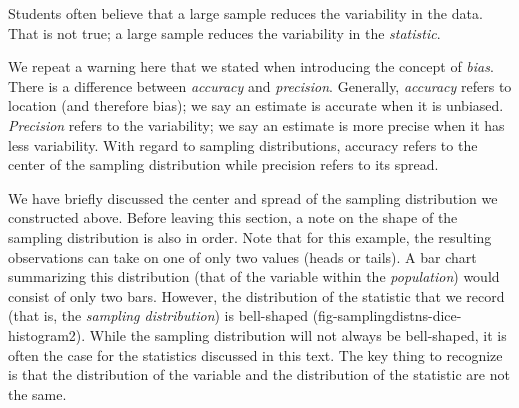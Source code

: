 \documentclass[
  letterpaper,
  DIV=11,
  numbers=noendperiod]{scrreprt}
\theoremstyle{definition}
\theoremstyle{definition}
\theoremstyle{plain}
\theoremstyle{remark}
\begin{document}
\begin{tcolorbox}[enhanced jigsaw, colbacktitle=quarto-callout-note-color!10!white, colback=white, left=2mm, title=\textcolor{quarto-callout-note-color}{\faInfo}\hspace{0.5em}{Note}, toptitle=1mm, leftrule=.75mm, breakable, bottomrule=.15mm, arc=.35mm, rightrule=.15mm, toprule=.15mm, coltitle=black, opacityback=0, colframe=quarto-callout-note-color-frame, opacitybacktitle=0.6, bottomtitle=1mm, titlerule=0mm]

Students often believe that a large sample reduces the variability in
the data. That is not true; a large sample reduces the variability in
the \emph{statistic}.

\end{tcolorbox}

\begin{tcolorbox}[enhanced jigsaw, colbacktitle=quarto-callout-warning-color!10!white, colback=white, left=2mm, title=\textcolor{quarto-callout-warning-color}{\faExclamationTriangle}\hspace{0.5em}{Warning}, toptitle=1mm, leftrule=.75mm, breakable, bottomrule=.15mm, arc=.35mm, rightrule=.15mm, toprule=.15mm, coltitle=black, opacityback=0, colframe=quarto-callout-warning-color-frame, opacitybacktitle=0.6, bottomtitle=1mm, titlerule=0mm]

We repeat a warning here that we stated when introducing the concept of
\emph{bias}. There is a difference between \emph{accuracy} and
\emph{precision}. Generally, \emph{accuracy} refers to location (and
therefore bias); we say an estimate is accurate when it is unbiased.
\emph{Precision} refers to the variability; we say an estimate is more
precise when it has less variability. With regard to sampling
distributions, accuracy refers to the center of the sampling
distribution while precision refers to its spread.

\end{tcolorbox}

We have briefly discussed the center and spread of the sampling
distribution we constructed above. Before leaving this section, a note
on the shape of the sampling distribution is also in order. Note that
for this example, the resulting observations can take on one of only two
values (heads or tails). A bar chart summarizing this distribution (that
of the variable within the \emph{population}) would consist of only two
bars. However, the distribution of the statistic that we record (that
is, the \emph{sampling distribution}) is bell-shaped
(fig-samplingdistns-dice-histogram2). While the sampling distribution
will not always be bell-shaped, it is often the case for the statistics
discussed in this text. The key thing to recognize is that the
distribution of the variable and the distribution of the statistic are
not the same.
\end{document}
